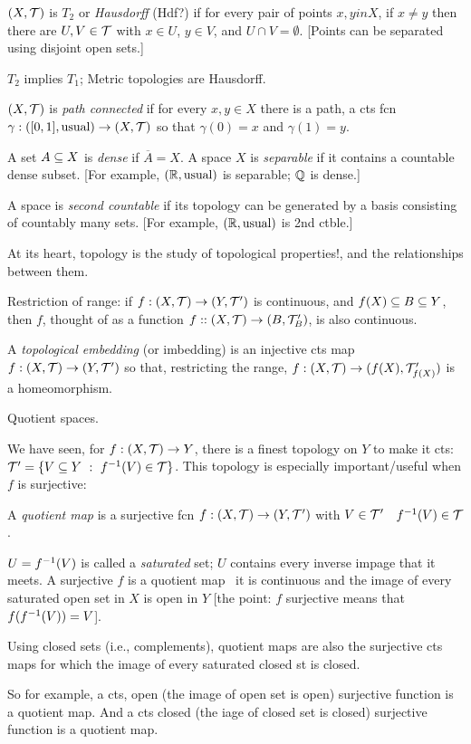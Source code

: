 \documentclass[12pt]{article}
\begin{document}
$(X,{\mathcal T})$ is $T_2$ or {\it Hausdorff} (Hdf?) if for every pair of points
$x,yin X$, if $x\neq y$ then there are $U,V\in{\mathcal T}$ with $x\in U$, $y\in V$, and $U\cap V=\emptyset$.
[Points can be separated using disjoint open sets.]

$T_2$ implies $T_1$; Metric topologies are Hausdorff.

$(X,{\mathcal T})$ is {\it path connected} if for every $x,y\in X$ there is a path, a
cts fcn $\gamma:([0,1],\textrm{usual})\rightarrow(X,{\mathcal T})$ so that $\gamma(0)=x$ and 
$\gamma(1)=y$.

A set $A\subseteq X$ is {\it dense} if $\overline{A}=X$. A space $X$ is {\it separable}
if it contains a countable dense subset. [For example, $({\mathbb R},\textrm{usual})$ is
separable; ${\mathbb Q}$ is dense.]

A space is {\it second countable} if its topology can be generated by a basis consisting of
countably many sets. [For example, $({\mathbb R},\textrm{usual})$ is 2nd ctble.]

At its heart, topology is the study of topological properties!, and the relationships
between them.

Restriction of range: if $f:(X,{\mathcal T})\rightarrow (Y,{\mathcal T}^\prime)$ is continuous, and $f(X)\subseteq B\subseteq Y$,
then $f$, thought of as a function $f::(X,{\mathcal T})\rightarrow (B,{\mathcal T}^\prime_B)$, is also continuous.

A {\it topological embedding} (or imbedding) is an injective cts map
$f:(X,{\mathcal T})\rightarrow (Y,{\mathcal T}^\prime)$ so that, restricting the range, $f:(X,{\mathcal T})\rightarrow (f(X),{\mathcal T}^\prime_{f(X)})$
is a homeomorphism. 

\msk

Quotient spaces.

We have seen, for $f:(X,{\mathcal T})\rightarrow Y$, there is a finest topology on $Y$ to make
it cts: $\mtp = \{V\sset Y\ :\ \finv(V)\in\mt\}$. This topology is especially
important/useful when $f$ is surjective:

A {\it quotient map} is a surjective fcn $f:(X,{\mathcal T})\rightarrow (Y,{\mathcal T}^\prime)$ with
$V\in{\mathcal T}^\prime$ \lra\ $f^{-1}(V)\in{\mathcal T}$.

$U=f^{-1}(V)$ is called a {\it saturated} set; $U$ contains every inverse impage that it meets.
A surjective $f$ is a quotient map \lra\ it is continuous and the image of every saturated
open set in $X$ is open in $Y$ [the point: $f$ surjective means that $f(f^{-1}(V))=V$].

Using closed sets (i.e., complements), quotient maps are also the surjective cts maps
for which the image of every saturated closed st is closed.

So for example, a cts, open (the image of  open set is open) surjective function
is a quotient map. And a cts closed (the iage of  closed set is closed)
surjective function is a quotient map.
\end{document}
